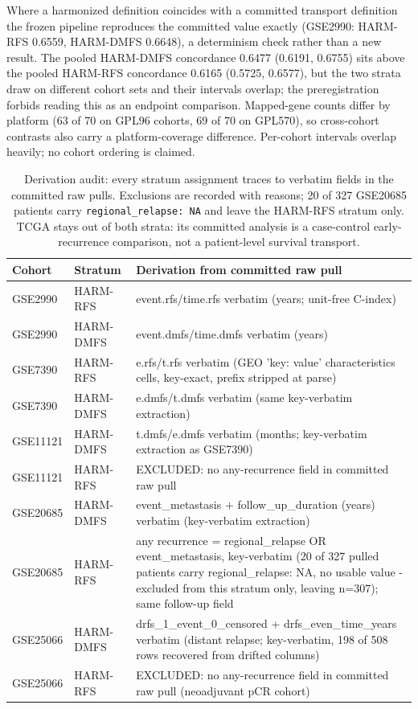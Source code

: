 Where a harmonized definition coincides with a committed transport definition the frozen pipeline reproduces the committed value exactly (GSE2990: HARM-RFS 0.6559, HARM-DMFS 0.6648), a determinism check rather than a new result. The pooled HARM-DMFS concordance 0.6477 (0.6191, 0.6755) sits above the pooled HARM-RFS concordance 0.6165 (0.5725, 0.6577), but the two strata draw on different cohort sets and their intervals overlap; the preregistration forbids reading this as an endpoint comparison. Mapped-gene counts differ by platform (63 of 70 on GPL96 cohorts, 69 of 70 on GPL570), so cross-cohort contrasts also carry a platform-coverage difference. Per-cohort intervals overlap heavily; no cohort ordering is claimed.
\begin{table}[htbp]\centering\footnotesize
\begin{tabular}{llp{2.6in}}\hline
Cohort & Stratum & Derivation from committed raw pull \\ \hline
GSE2990 & HARM-RFS & event.rfs/time.rfs verbatim (years; unit-free C-index) \\
GSE2990 & HARM-DMFS & event.dmfs/time.dmfs verbatim (years) \\
GSE7390 & HARM-RFS & e.rfs/t.rfs verbatim (GEO 'key: value' characteristics cells, key-exact, prefix stripped at parse) \\
GSE7390 & HARM-DMFS & e.dmfs/t.dmfs verbatim (same key-verbatim extraction) \\
GSE11121 & HARM-DMFS & t.dmfs/e.dmfs verbatim (months; key-verbatim extraction as GSE7390) \\
GSE11121 & HARM-RFS & EXCLUDED: no any-recurrence field in committed raw pull \\
GSE20685 & HARM-DMFS & event\_metastasis + follow\_up\_duration (years) verbatim (key-verbatim extraction) \\
GSE20685 & HARM-RFS & any recurrence = regional\_relapse OR event\_metastasis, key-verbatim (20 of 327 pulled patients carry regional\_relapse: NA, no usable value - excluded from this stratum only, leaving n=307); same follow-up field \\
GSE25066 & HARM-DMFS & drfs\_1\_event\_0\_censored + drfs\_even\_time\_years verbatim (distant relapse; key-verbatim, 198 of 508 rows recovered from drifted columns) \\
GSE25066 & HARM-RFS & EXCLUDED: no any-recurrence field in committed raw pull (neoadjuvant pCR cohort) \\
\hline\end{tabular}
\caption{Derivation audit: every stratum assignment traces to verbatim fields in the committed raw pulls. Exclusions are recorded with reasons; 20 of 327 GSE20685 patients carry \texttt{regional\_relapse:\ NA} and leave the HARM-RFS stratum only. TCGA stays out of both strata: its committed analysis is a case-control early-recurrence comparison, not a patient-level survival transport.}\label{tab:harm-deriv}
\end{table}
